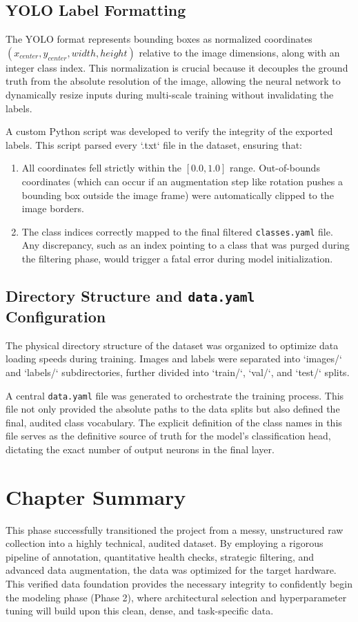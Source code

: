 \subsection{YOLO Label Formatting}
The YOLO format represents bounding boxes as normalized coordinates $(x_{center}, y_{center}, width, height)$ relative to the image dimensions, along with an integer class index. This normalization is crucial because it decouples the ground truth from the absolute resolution of the image, allowing the neural network to dynamically resize inputs during multi-scale training without invalidating the labels. 

A custom Python script was developed to verify the integrity of the exported labels. This script parsed every `.txt` file in the dataset, ensuring that:
\begin{enumerate}
    \item All coordinates fell strictly within the $[0.0, 1.0]$ range. Out-of-bounds coordinates (which can occur if an augmentation step like rotation pushes a bounding box outside the image frame) were automatically clipped to the image borders.
    \item The class indices correctly mapped to the final filtered \texttt{classes.yaml} file. Any discrepancy, such as an index pointing to a class that was purged during the filtering phase, would trigger a fatal error during model initialization.
\end{enumerate}

\subsection{Directory Structure and \texttt{data.yaml} Configuration}
The physical directory structure of the dataset was organized to optimize data loading speeds during training. Images and labels were separated into `images/` and `labels/` subdirectories, further divided into `train/`, `val/`, and `test/` splits.

A central \texttt{data.yaml} file was generated to orchestrate the training process. This file not only provided the absolute paths to the data splits but also defined the final, audited class vocabulary. The explicit definition of the class names in this file serves as the definitive source of truth for the model's classification head, dictating the exact number of output neurons in the final layer.

\section{Chapter Summary}
This phase successfully transitioned the project from a messy, unstructured raw collection into a highly technical, audited dataset. By employing a rigorous pipeline of annotation, quantitative health checks, strategic filtering, and advanced data augmentation, the data was optimized for the target hardware. This verified data foundation provides the necessary integrity to confidently begin the modeling phase (Phase 2), where architectural selection and hyperparameter tuning will build upon this clean, dense, and task-specific data.